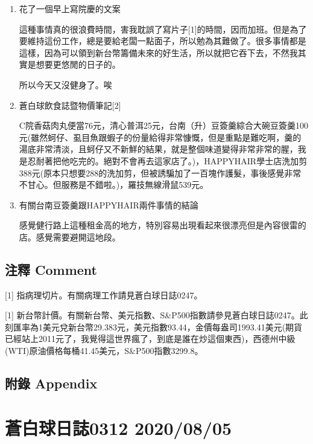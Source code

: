 \documentclass[
]{article}
\begin{document}
\begin{enumerate}
\def\labelenumi{\arabic{enumi}.}
\item
  花了一個早上寫院慶的文案

  這種事情真的很浪費時間，害我耽誤了寫片子{[}1{]}的時間，因而加班。但是為了要維持這份工作，總是要給老闆一點面子，所以勉為其難做了。很多事情都是這樣，因為可以領到新台幣籌備未來的好生活，所以就把它吞下去，不然我其實是想要更悠閒的日子的。

  所以今天又沒健身了。唉
\item
  蒼白球飲食誌暨物價筆記{[}2{]}

  C院香菇肉丸便當76元，清心普洱25元，台南（升）豆簽羹綜合大碗豆簽羹100元(雖然蚵仔、虱目魚跟蝦子的份量給得非常慷慨，但是重點是難吃啊，羹的湯底非常清淡，且蚵仔又不新鮮的結果，就是整個味道變得非常非常的腥，我是忍耐著把他吃完的。絕對不會再去這家店了。)，HAPPYHAIR學士店洗加剪388元(原本只想要288的洗加剪，但被誘騙加了一百塊作護髮，事後感覺非常不甘心。但服務是不錯啦。)，羅技無線滑鼠539元。
\item
  有關台南豆簽羹跟HAPPYHAIR兩件事情的結論

  感覺健行路上這種租金高的地方，特別容易出現看起來很漂亮但是內容很雷的店。感覺需要避開這地段。
\end{enumerate}

\hypertarget{ux6ce8ux91cb-comment-3}{%
\subsection{注釋 Comment}\label{ux6ce8ux91cb-comment-3}}

{[}1{]} 指病理切片。有關病理工作請見蒼白球日誌0247。

{[}1{]}
新台幣計價。有關新台幣、美元指數、S\&P500指數請參見蒼白球日誌0247。此刻匯率為1美元兌新台幣29.383元，美元指數93.44，金價每盎司1993.41美元(期貨已經站上2011元了，我覺得這世界瘋了，到底是誰在炒這個東西)，西德州中級(WTI)原油價格每桶41.45美元，S\&P500指數3299.8。

\hypertarget{ux9644ux9304-appendix-3}{%
\subsection{附錄 Appendix}\label{ux9644ux9304-appendix-3}}

\hypertarget{ux84bcux767dux7403ux65e5ux8a8c0312-20200805}{%
\section{蒼白球日誌0312
2020/08/05}\label{ux84bcux767dux7403ux65e5ux8a8c0312-20200805}}
\end{document}
